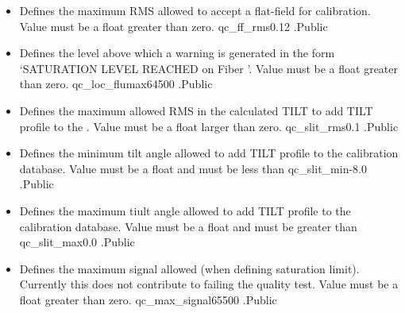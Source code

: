 \begin{itemize}
\item {}
{Defines the maximum RMS allowed to accept a flat-field for calibration. Value must be a float greater than zero.}
{qc\_ff\_rms}{0.12}
{\calFFraw}{\constantsfile}{\calFFraw.\progMAIN}{Public}

\item {}
{Defines the level above which a warning is generated in the form `SATURATION LEVEL REACHED on Fiber '. Value must be a float greater than zero.}
{qc\_loc\_flumax}{64500}
{\calFFraw}{\constantsfile}{\calFFraw.\progMAIN}{Public}

\item {} 
{Defines the maximum allowed RMS in the calculated TILT to add TILT profile to the \calibdb. Value must be a float larger than zero.}
{qc\_slit\_rms}{0.1}
{\calSLIT}{\constantsfile}{\calSLIT.\progMAIN}{Public}

\item {} 
{Defines the minimum tilt angle allowed to add TILT profile to the calibration database. Value must be a float and must be less than }
{qc\_slit\_min}{-8.0}
{\calSLIT}{\constantsfile}{\calSLIT.\progMAIN}{Public}

\item {} 
{Defines the maximum tiult angle allowed to add TILT profile to the calibration database. Value must be a float and must be greater than }
{qc\_slit\_max}{0.0}
{\calSLIT}{\constantsfile}{\calSLIT.\progMAIN}{Public}

\item {} 
{Defines the maximum signal allowed (when defining saturation limit). Currently this does not contribute to failing the quality test. Value must be a float greater than zero.}
{qc\_max\_signal}{65500}
{\calextractRAW}{\constantsfile}{\calextractRAW.\progMAIN}{Public}


\end{itemize}








